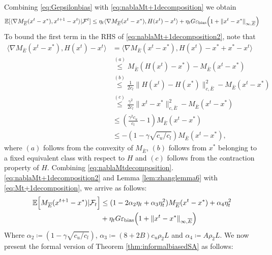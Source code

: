 Combining \eqref{eq:Gepsilonbias} with \eqref{eq:nablaMt+1decomposition} we obtain
\begin{equation} \label{eq:nablaMt+1decomposition2}
     \mathbb{E}[\langle \nabla M_{\overline{E}}(x^t - x^*), x^{t+1} - x^t \rangle | \mathcal{F}^t] \leq \eta_t\langle \nabla M_{\overline{E}}(x^t - x^*), H(x^t) - x^t \rangle+ \eta_tG\varepsilon_{\text{bias}}  \Bigl(1 + \|x^t - x^*\|_{\infty,\overline{E}}\Bigr)
\end{equation}
To bound the first term in the RHS of \eqref{eq:nablaMt+1decomposition2}, note that
\begin{align} \label{eq:nablaMtdecomposition}
    \langle \nabla M_{\bar{E}}(x^t - x^*), H(x^t) - x^t \rangle 
    &= \langle \nabla M_{\bar{E}}(x^t - x^*), H(x^t) - x^* + x^* - x^t \rangle \nonumber\\
    &\overset{(a)}{\leq}M_{\bar{E}}(H(x^t) - x^*) - M_{\bar{E}}(x^t - x^*) \nonumber\\
    &\overset{(b)}{\leq} \frac{1}{2 c_l} \| H(x^t) - H(x^*) \|^2_{c, \bar{E}} - M_{\bar{E}}(x^t - x^*)\nonumber\\
    &\overset{(c)}{\leq} \frac{\gamma^2}{2 c_l} \| x^t - x^* \|^2_{c, \bar{E}} - M_{\bar{E}}(x^t - x^*) \nonumber\\
    &\leq \left( \frac{\gamma^2 c_u}{c_l} - 1 \right) M_{\bar{E}}(x^t - x^*) \nonumber\\
    &\leq -(1 - \gamma \sqrt{c_u / c_l}) M_{\bar{E}}(x^t - x^*),
\end{align}
where \((a)\) follows from the convexity of $ M_{\bar{E}} $, \((b)\) follows from \( x^* \) belonging to a fixed equivalent class with respect to \( H \) and \((c)\) follows from the contraction property of \( H \). Combining \eqref{eq:nablaMtdecomposition}. \eqref{eq:nablaMt+1decomposition2} and Lemma \ref{lem:zhanglemma6} with \eqref{eq:Mt+1decomposition}, we arrive as follows:
\begin{align} \label{eq:modified_proposition3}
    \mathbb{E}\Bigl[ 
     M_{\overline{E}}(x^{t+1} - x^*) | \mathcal{F}_t\Bigr] & \leq (1-2\alpha_2 \eta_t +\alpha_3\eta_t^2)  M_{\overline{E}}(x^{t} - x^*) + \alpha_4 \eta_t^2 \nonumber \\
    &+ \eta_t G\varepsilon_{\text{bias}}  \Bigl(1 + \|x^t - x^*\|_{\infty,\overline{E}}\Bigr)
\end{align}
Where $\alpha_2 \coloneqq (1-\gamma \sqrt{c_{{u}} / c_{{l}}})$, $\alpha_3 \coloneqq (8+2B)c_{{u}} \rho_2 L$ and $\alpha_4 \coloneqq A\rho_2L$. We now present the formal version of Theorem \ref{thm:informalbiasedSA} as follows:

